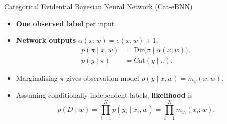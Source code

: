 \begin{frame}{Categorical Evidential Bayesian Neural Network (Cat-eBNN)}
\label{frm:cat-ebnn}
\label{frm:cat-ebnn-setup}
\setlength{\abovedisplayskip}{4pt}
\setlength{\belowdisplayskip}{4pt}
\begin{itemize}
\setlength{\itemsep}{5mm}
\item \textbf{One observed label} per input.
\item \textbf{Network outputs} $\alpha(x;w)=e(x;w)+1$, %
\begin{align*}
p(\pi\mid x,w)&=\mathrm{Dir}\bigl(\pi\mid\alpha(x;w)\bigr),\\[1mm]
p(y\mid\pi)&=\mathrm{Cat}(y\mid\pi).
\end{align*}
\item<2-> Marginalising $\pi$ gives observation model $p(y\mid x,w)=m_y(x;w)$.
\item<3-> Assuming conditionally independent labels, \textbf{likelihood} is%
\[
p(D\mid w)=\prod_{i=1}^{N}p(y_i\mid x_i,w)=\prod_{i=1}^{N}m_{y_i}(x_i;w).
\]
\end{itemize}
\end{frame}


